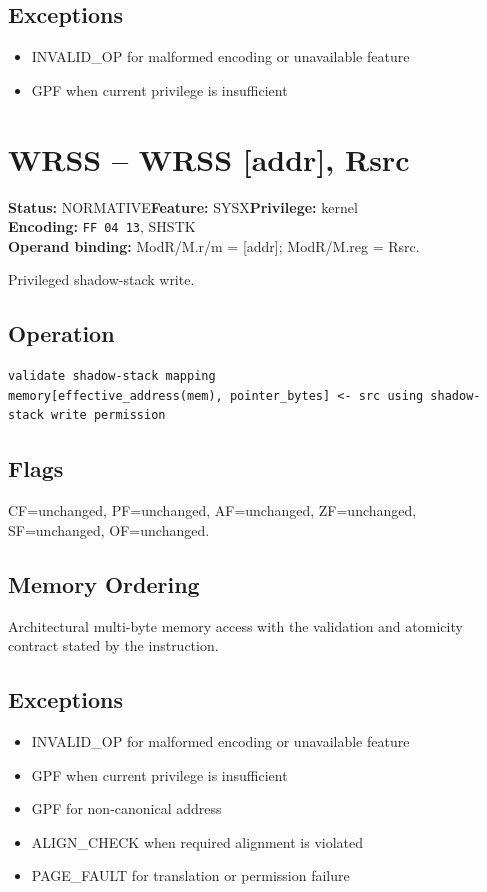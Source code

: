 \documentclass[10pt]{article}
\begin{document}
\subsection*{Exceptions}
\begin{itemize}
\item INVALID\_OP for malformed encoding or unavailable feature
\item GPF when current privilege is insufficient
\end{itemize}
\clearpage

\section{WRSS -- WRSS [addr], Rsrc}
\textbf{Status:} NORMATIVE\quad \textbf{Feature:} SYSX\quad \textbf{Privilege:} kernel\\
\textbf{Encoding:} \texttt{FF 04 13}, SHSTK\\
\textbf{Operand binding:} ModR/M.r/m = [addr]; ModR/M.reg = Rsrc.

Privileged shadow-stack write.

\subsection*{Operation}
\begin{lstlisting}
validate shadow-stack mapping
memory[effective_address(mem), pointer_bytes] <- src using shadow-stack write permission
\end{lstlisting}
\subsection*{Flags}
CF=unchanged, PF=unchanged, AF=unchanged, ZF=unchanged, SF=unchanged, OF=unchanged.
\subsection*{Memory Ordering}
Architectural multi-byte memory access with the validation and atomicity contract stated by the instruction.
\subsection*{Exceptions}
\begin{itemize}
\item INVALID\_OP for malformed encoding or unavailable feature
\item GPF when current privilege is insufficient
\item GPF for non-canonical address
\item ALIGN\_CHECK when required alignment is violated
\item PAGE\_FAULT for translation or permission failure
\end{itemize}
\clearpage
\end{document}
